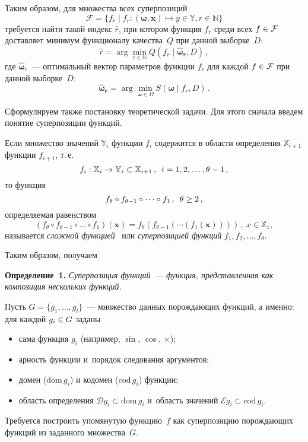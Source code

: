 \begin{multicols}{2}
Таким образом, для множества всех суперпозиций
$$
\mathcal{F} = \{ f_r \mid
            f_r : (\boldsymbol{\omega}, \mathbf{x}) \mapsto y \in \mathbb{Y},
            r \in \mathbb{N} \}
$$
требуется найти такой индекс $\hat{r}$, при котором функция $f_r$ среди всех
$f \hm\in \mathcal{F}$ доставляет минимум функционалу качества~$Q$ при данной
выборке~$D$:
\begin{equation*}
  \label{eq:hat_r}
  \hat{r} = \arg \min\limits_{r \in \mathbb{N}} Q (f_r \mid \boldsymbol{\hat{\omega}_r}, D)\,,
\end{equation*}
где $\boldsymbol{\hat{\omega}}_r$~--- оптимальный вектор параметров функции
$f_r$ для каждой $f \hm\in \mathcal{F}$ при данной выборке~$D$:
\begin{equation*}
  \boldsymbol{\hat{\omega}_r} = 
  \arg \min\limits_{\boldsymbol{\omega} \in \Omega} S(\boldsymbol{\omega} \mid f_r, D)\,.
\end{equation*}

Сформулируем также постановку теоретической задачи. Для этого сначала
введем понятие суперпозиции функций.

Если множество значений $\mathbb{Y}_i$ функции $f_i$ содержится в области
определения $\mathbb{X}_{i+1}$ функции $f_{i+1}$, т.\,е.\
$$
f_i : \mathbb{X}_i \to \mathbb{Y}_i \subset \mathbb{X}_{i+1}\,,\enskip i = 1, 2, \dots, \theta - 1\,,
$$
то функция
$$
f_\theta \circ f_{\theta-1} \circ \dots \circ f_1\,, \enskip \theta \geq 2\,,
$$
определяемая равенством
$$
(f_\theta \circ f_{\theta-1} \circ \dots \circ f_1) (\mathbf{x}) =
  f_{\theta} (f_{\theta-1} (\cdots (f_1 (\mathbf{x}))))\,, 
  \ x \in \mathbb{X}_1,
$$
называется \textit{сложной функцией}~\cite{MathEnc1984_4} или
\textit{суперпозицией функций} $f_1, f_2, \dots, f_\theta$.

Таким образом, получаем

\smallskip

\noindent
\textbf{Определение~1.}
\textit{Суперпозиция функций~--- функция, представленная как композиция нескольких
  функций.}
  
  \smallskip


Пусть $G = \{ g_1, \dots, g_l \}$~--- множество данных порождающих
функций, а именно: для каждой $g_i \hm\in G$ заданы
\begin{itemize}
  \item сама функция $g_i$ (например, $\sin$, $\cos$, $\times$);
  \item арность функции и~порядок следования аргументов;
  \item домен ($\text{dom}\, g_i$) и кодомен ($\text{cod}\, g_i$) функции;
  \item область определения $\mathcal{D} g_i \subset \text{dom}\, g_i$ и~область
    значений $\mathcal{E} g_i \subset \text{cod}\, g_i$.
\end{itemize}
Требуется построить упомянутую функцию~$f$ как суперпозицию порождающих
функций из заданного множества~$G$.


\end{multicols}
